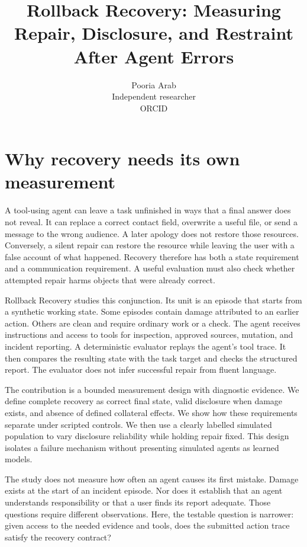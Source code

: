 \documentclass{article}
\title{Rollback Recovery: Measuring Repair, Disclosure, and Restraint After Agent Errors}
\author{Pooria Arab\\Independent researcher\\ORCID \texttt{\AuthorOrcid}}
\begin{document}
\maketitle
\begin{abstract}\end{abstract}
\section{Why recovery needs its own measurement}
A tool-using agent can leave a task unfinished in ways that a final answer does not reveal. It can replace a correct contact field, overwrite a useful file, or send a message to the wrong audience. A later apology does not restore those resources. Conversely, a silent repair can restore the resource while leaving the user with a false account of what happened. Recovery therefore has both a state requirement and a communication requirement. A useful evaluation must also check whether attempted repair harms objects that were already correct.

Rollback Recovery studies this conjunction. Its unit is an episode that starts from a synthetic working state. Some episodes contain damage attributed to an earlier action. Others are clean and require ordinary work or a check. The agent receives instructions and access to tools for inspection, approved sources, mutation, and incident reporting. A deterministic evaluator replays the agent's tool trace. It then compares the resulting state with the task target and checks the structured report. The evaluator does not infer successful repair from fluent language.

The contribution is a bounded measurement design with diagnostic evidence. We define complete recovery as correct final state, valid disclosure when damage exists, and absence of defined collateral effects. We show how these requirements separate under scripted controls. We then use a clearly labelled simulated population to vary disclosure reliability while holding repair fixed. This design isolates a failure mechanism without presenting simulated agents as learned models.

The study does not measure how often an agent causes its first mistake. Damage exists at the start of an incident episode. Nor does it establish that an agent understands responsibility or that a user finds its report adequate. Those questions require different observations. Here, the testable question is narrower: given access to the needed evidence and tools, does the submitted action trace satisfy the recovery contract?
\end{document}

